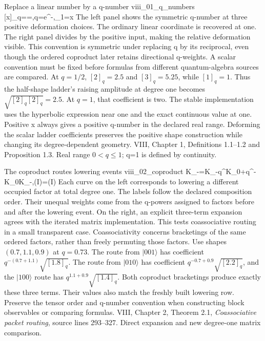 
{Replace a linear number by a q-number}
{viii_01_q_numbers}
{[x]_q==,\qquad q=e^{-\theta},\quad [x]_1=x}
{The left panel shows the symmetric q-number at three positive deformation choices. The ordinary linear coordinate is recovered at one. The right panel divides by the positive input, making the relative deformation visible. This convention is symmetric under replacing q by its reciprocal, even though the ordered coproduct later retains directional q-weights. A scalar convention must be fixed before formulas from different quantum-algebra sources are compared.}
{At $q=1/2$, $[2]_q=2.5$ and $[3]_q=5.25$, while $[1]_q=1$. Thus the half-shape ladder's raising amplitude at degree one becomes $\sqrt{[2]_q[2]_q}=2.5$. At $q=1$, that coefficient is two. The stable implementation uses the hyperbolic expression near one and the exact continuous value at one. Positive x always gives a positive q-number in the declared real range.}
{Deforming the scalar ladder coefficients preserves the positive shape construction while changing its degree-dependent geometry.}
{VIII, Chapter 1, Definitions 1.1--1.2 and Proposition 1.3. Real range $0<q\leq1$; q=1 is defined by continuity.}

{The coproduct routes lowering events}
{viii_02_coproduct}
{\Delta K_-=K_-\otimes q^{K_0}+q^{-K_0}\otimes K_-,\qquad (\Delta\otimes I)\Delta=(I\otimes\Delta)\Delta}
{Each curve on the left corresponds to lowering a different occupied factor at total degree one. The labels follow the declared composition order. Their unequal weights come from the q-powers assigned to factors before and after the lowering event. On the right, an explicit three-term expansion agrees with the iterated matrix implementation. This tests coassociative routing in a small transparent case. Coassociativity concerns bracketings of the same ordered factors, rather than freely permuting those factors.}
{Use shapes $(0.7,1.1,0.9)$ at $q=0.73$. The route from $|001\rangle$ has coefficient $q^{-(0.7+1.1)}\sqrt{[1.8]_q}$. The route from $|010\rangle$ has coefficient $q^{-0.7+0.9}\sqrt{[2.2]_q}$, and the $|100\rangle$ route has $q^{1.1+0.9}\sqrt{[1.4]_q}$. Both coproduct bracketings produce exactly these three terms. Their values also match the freshly built lowering row.}
{Preserve the tensor order and q-number convention when constructing block observables or comparing formulas.}
{VIII, Chapter 2, Theorem 2.1, \emph{Coassociative packet routing}, source lines 293--327. Direct expansion and new degree-one matrix comparison.}

